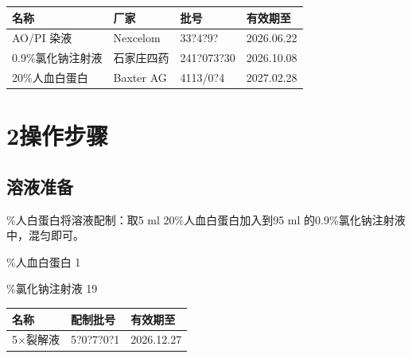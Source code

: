 \documentclass[UTF8,10pt,a4paper,fontset=fandol]{ctexart}
\newcommand{\fieldvalue}[1]{#1}
\newcommand{\handwritten}[1]{#1}
\begin{document}
\begin{tabularx}{\textwidth}{|X|X|X|X|}
\hline
名称 & 厂家 & 批号 & 有效期至\\
\hline
\fieldvalue{AO/PI 染液}
&
\fieldvalue{Nexcelom}
&
\fieldvalue{\handwritten{33?4?9?}}
&
\fieldvalue{\handwritten{2026.06.22}}\\
\hline
\fieldvalue{0.9\%氯化钠注射液}
&
\fieldvalue{石家庄四药}
&
\fieldvalue{\handwritten{241?073?30}}
&
\fieldvalue{\handwritten{2026.10.08}}\\
\hline
\fieldvalue{20\%人血白蛋白}
&
\fieldvalue{Baxter AG}
&
\fieldvalue{\handwritten{4113/0?4}}
&
\fieldvalue{\handwritten{2027.02.28}}\\
\hline
\end{tabularx}

\section{2\quad 操作步骤}

\subsection{溶液准备}

\%人白蛋白将溶液配制：取5 ml 20\%人血白蛋白加入到95 ml 的0.9\%氯化钠注射液中，混匀即可。

\%人血白蛋白
\fieldvalue{\handwritten{1}}\ 

\%氯化钠注射液
\fieldvalue{\handwritten{19}}\ 

\begin{tabularx}{\textwidth}{|X|X|X|}
\hline
名称 & 配制批号 & 有效期至\\
\hline
5$\times$裂解液 &
\fieldvalue{\handwritten{5?0?7?0?1}}
&
\fieldvalue{\handwritten{2026.12.27}}\\
\hline
\end{tabularx}
\end{document}
